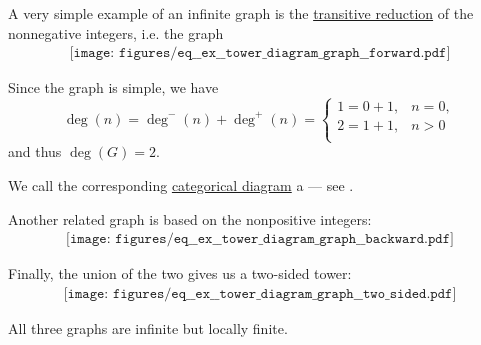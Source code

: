 \begin{example}\label{ex:tower_diagram_graph}
  A very simple example of an infinite graph is the \hyperref[def:derived_relations/transitive]{transitive reduction} of the nonnegative integers, i.e. the graph
  \begin{equation}\label{eq:ex:tower_diagram_graph/forward}
    \begin{aligned}
      \texttt{[image: figures/eq\_\_ex\_\_tower\_diagram\_graph\_\_forward.pdf]}
    \end{aligned}
  \end{equation}

  Since the graph is simple, we have
  \begin{equation*}
    \deg(n) = \deg^-(n) + \deg^+(n) = \begin{cases}
      1 = 0 + 1, &n = 0, \\
      2 = 1 + 1, &n > 0 \\
    \end{cases}
  \end{equation*}
  and thus \( \deg(G) = 2 \).

  We call the corresponding \hyperref[def:categorical_diagram]{categorical diagram} a  --- see .

  Another related graph is based on the nonpositive integers:
  \begin{equation}\label{eq:ex:tower_diagram_graph/backward}
    \begin{aligned}
      \texttt{[image: figures/eq\_\_ex\_\_tower\_diagram\_graph\_\_backward.pdf]}
    \end{aligned}
  \end{equation}

  Finally, the union of the two gives us a two-sided tower:
  \begin{equation}\label{eq:ex:tower_diagram_graph/two_sided}
    \begin{aligned}
      \texttt{[image: figures/eq\_\_ex\_\_tower\_diagram\_graph\_\_two\_sided.pdf]}
    \end{aligned}
  \end{equation}

  All three graphs are infinite but locally finite.
\end{example}

